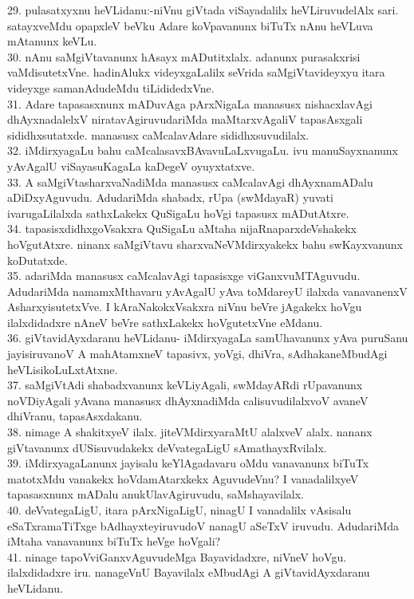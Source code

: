 \documentclass{article}
\begin{document}
29. pulasatxyxnu heVLidanu:-niVnu giVtada viSayadalilx heVLiruvudelAlx sari. satayxveMdu opapxleV beVku Adare koVpavanunx biTuTx nAnu heVLuva mAtanunx keVLu.\\
30. nAnu saMgiVtavanunx hAsayx mADutitxlalx. adanunx purasakxrisi vaMdisutetxVne. hadinAlukx videyxgaLalilx seVrida saMgiVtavideyxyu itara videyxge samanAdudeMdu tiLididedxVne.\\
31. Adare tapasasxnunx mADuvAga pArxNigaLa manasusx nishacxlavAgi dhAyxnadalelxV niratavAgiruvudariMda maMtarxvAgaliV tapasAsxgali sididhxsutatxde. manasusx caMcalavAdare sididhxsuvudilalx.\\
32. iMdirxyagaLu bahu caMcalasavxBAvavuLaLxvugaLu. ivu manuSayxnanunx yAvAgalU viSayasuKagaLa kaDegeV oyuyxtatxve.\\
33. A saMgiVtasharxvaNadiMda manasusx caMcalavAgi dhAyxnamADalu aDiDxyAguvudu. AdudariMda shabadx, rUpa (swMdayaR) yuvati ivarugaLilalxda sathxLakekx QuSigaLu hoVgi tapasusx mADutAtxre.\\
34. tapasisxdidhxgoVsakxra QuSigaLu aMtaha nijaRnaparxdeVshakekx hoVgutAtxre. ninanx saMgiVtavu sharxvaNeVMdirxyakekx bahu swKayxvanunx koDutatxde.\\
35. adariMda manasusx caMcalavAgi tapasisxge viGanxvuMTAguvudu. AdudariMda namamxMthavaru yAvAgalU yAva toMdareyU ilalxda vanavanenxV AsharxyisutetxVve. I kAraNakokxVsakxra niVnu beVre jAgakekx hoVgu ilalxdidadxre nAneV beVre sathxLakekx hoVgutetxVne eMdanu.\\
36. giVtavidAyxdaranu heVLidanu- iMdirxyagaLa samUhavanunx yAva puruSanu jayisiruvanoV A mahAtamxneV tapasivx, yoVgi, dhiVra, sAdhakaneMbudAgi heVLisikoLuLxtAtxne.\\
37. saMgiVtAdi shabadxvanunx keVLiyAgali, swMdayARdi rUpavanunx noVDiyAgali yAvana manasusx dhAyxnadiMda calisuvudilalxvoV avaneV dhiVranu, tapasAsxdakanu.\\
38. nimage A shakitxyeV ilalx. jiteVMdirxyaraMtU alalxveV alalx. nananx giVtavanunx dUSisuvudakekx deVvategaLigU sAmathayxRvilalx.\\
39. iMdirxyagaLanunx jayisalu keYlAgadavaru oMdu vanavanunx biTuTx matotxMdu vanakekx hoVdamAtarxkekx AguvudeVnu? I vanadalilxyeV tapasasxnunx mADalu anukUlavAgiruvudu, saMshayavilalx.\\
40. deVvategaLigU, itara pArxNigaLigU, ninagU I vanadalilx vAsisalu eSaTxramaTiTxge bAdhayxteyiruvudoV nanagU aSeTxV iruvudu. AdudariMda iMtaha vanavanunx biTuTx heVge hoVgali?\\
41. ninage tapoVviGanxvAguvudeMga Bayavidadxre, niVneV hoVgu. ilalxdidadxre iru. nanageVnU Bayavilalx eMbudAgi A giVtavidAyxdaranu heVLidanu.\\
\end{document}
